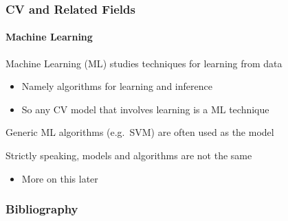 \documentclass[xetex,professionalfont]{beamer}
\let\oldemph\emph
\renewcommand\emph[1]{\textcolor{tuwcvl_inf_red}{#1}}
\begin{document}
\begin{frame}
\frametitle{CV and Related Fields}
\framesubtitle{Machine Learning}

\emph{Machine Learning} (\emph{ML}) studies techniques for learning from data
\begin{itemize}
    \item Namely algorithms for learning and inference
    \item So any CV model that involves learning is a ML technique
\end{itemize}

\bigskip
Generic ML algorithms (e.g.\ SVM) are often used as the model %

\bigskip
Strictly speaking, models and algorithms are not the same
\begin{itemize}
    \item More on this later
\end{itemize}

\end{frame}


\renewcommand\emph[1]{\oldemph{#1}}

\begin{frame}[allowframebreaks=0.9]
\frametitle{Bibliography}

\printbibliography

\end{frame}
\end{document}
